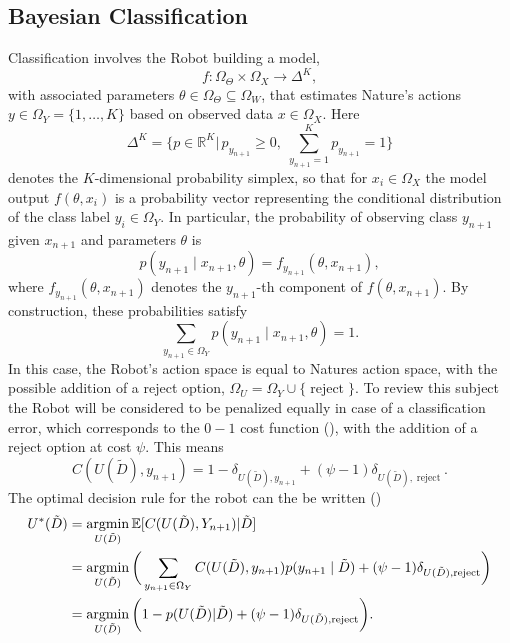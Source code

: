 \subsection{Bayesian Classification}
\label{chp:baycl}
Classification involves the Robot building a model,
\begin{equation}
	f: \Omega_\Theta \times \Omega_X \to \Delta^K,
\end{equation}
with associated parameters $\theta \in \Omega_\Theta\subseteq\Omega_W$, that estimates Nature's actions $y\in \Omega_Y= \{1,\dots,K\}$ based on observed data $x\in \Omega_X$. Here
\begin{equation}
	\Delta^K = \bigg\{p \in \mathbb{R}^K \bigg|\, p_{y_{n+1}} \geq 0,\; \sum_{y_{n+1}=1}^K p_{y_{n+1}} = 1\bigg\}
\end{equation} 
denotes the $K$-dimensional probability simplex, so that for $x_i \in \Omega_X$ the model output $f(\theta,x_i)$ is a probability vector representing the conditional distribution of the class label $y_i \in \Omega_Y$. In particular, the probability of observing class $y_{n+1}$ given $x_{n+1}$ and parameters $\theta$ is 
\begin{equation}
	p(y_{n+1} \mid x_{n+1}, \theta) = f_{y_{n+1}}(\theta,x_{n+1}),
	\label{f_dist2}
\end{equation}
where $f_{y_{n+1}}(\theta,x_{n+1})$ denotes the $y_{n+1}$-th component of $f(\theta,x_{n+1})$. 
By construction, these probabilities satisfy
\begin{equation}
	\sum_{y_{n+1} \in \Omega_Y} p(y_{n+1} \mid x_{n+1}, \theta) = 1.
\end{equation}
In this case, the Robot's action space is equal to Natures action space, with the possible addition of a reject option, $\Omega_U=\Omega_Y\cup \{\operatorname{reject}\}$. To review this subject the Robot will be considered to be penalized equally in case of a classification error, which corresponds to the $0-1$ cost function (), with the addition of a reject option at cost $\psi$. This means
\begin{equation}
	C(U(\tilde{D}),y_{n+1}) = 1- \delta_{U(\tilde{D}),y_{n+1}}+(\psi-1)\delta_{U(\tilde{D}),\operatorname{reject}}.
\end{equation}
The optimal decision rule for the robot can the be written ()
\begin{equation}
	\begin{split}
		U^*(\tilde{D}) & = \operatorname*{argmin}_{U(\tilde{D})}\mathbb{E}[C(U(\tilde{D}), Y_{n+1})|\tilde{D}]\\
		&= \operatorname*{argmin}_{U(\tilde{D})}\bigg(\sum_{y_{n+1}\in \Omega_Y}C(U(\tilde{D}),y_{n+1})p(y_{n+1}\mid\tilde{D})+(\psi-1)\delta_{U(\tilde{D}),\operatorname{reject}}\bigg)\\
		& = \operatorname*{argmin}_{U(\tilde{D})}\bigg(1- p(U(\tilde{D})|\tilde{D})+(\psi-1)\delta_{U(\tilde{D}),\operatorname{reject}}\bigg).
	\end{split}
	\label{eq:expected_cost1}
\end{equation}
